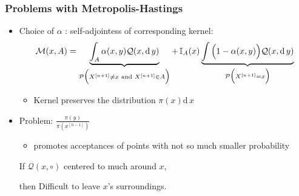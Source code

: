 \documentclass[xetex]{beamer}
\begin{document}
	\begin{frame}[t]\frametitle{Problems with Metropolis-Hastings}
	    	
		\begin{itemize}
			\item Choice of $\alpha$ : self-adjointess of corresponding kernel:
				$$ \mathcal{M}(x, A) = \underbrace{\int_A \alpha(x,y) \mathcal{Q}(x, \mathrm{d}\,y)}_{\mathcal{P} \Big( X^{[n+1]}\not=x \,\,\text{and}\,\, X^{[n+1]} \in A \Big) } + \,
				\mathbb{I}_A(x) \underbrace{\int \Big(1- \alpha(x,y)\Big) \mathcal{Q}(x, \mathrm{d}\,y)}_{\mathcal{P} \Big( X^{[n+1]} = x\Big)}$$
			\begin{itemize}
				\item Kernel preserves the distribution $\pi(x)\mathrm{d}\,x$
			\end{itemize}

			\item Problem: $\frac{\pi(y)}{\pi(x^{[n-1]})}$
			\begin{itemize}
				\item 	 promotes acceptances of points with not so much smaller probability
			\end{itemize}

			\item[If] 	$\mathcal{Q}(x,\circ)$ centered to much around $x$, 
			\item[then] Difficult to leave $x$'s surroundings.
		\end{itemize}
	
	\end{frame}


\end{document}
